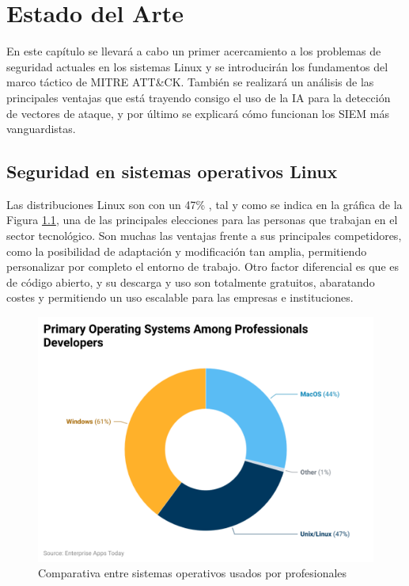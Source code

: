 \chapter{Estado del Arte}


\vspace{-0.3cm}

En este capítulo se llevará a cabo un primer acercamiento a los problemas de seguridad actuales en los sistemas Linux y se introducirán los fundamentos del marco táctico de MITRE \gls{ATT&CK}. También se realizará un análisis de las principales ventajas que está trayendo consigo el uso de la \gls{IA} para la detección de vectores de ataque, y por último se explicará cómo funcionan los \gls{SIEM} más vanguardistas.

\vspace{0.3cm}

\section{Seguridad en sistemas operativos Linux}

Las distribuciones Linux son con un 47\% \cite{linux-stats}, tal y como se indica en la gráfica de la Figura \ref{fig:linux-stats}, una de las principales elecciones para las personas que trabajan en el sector tecnológico. Son muchas las ventajas frente a sus principales competidores, como la posibilidad de adaptación y modificación tan amplia, permitiendo personalizar por completo el entorno de trabajo. Otro factor diferencial es que es de código abierto, y su descarga y uso son totalmente gratuitos, abaratando costes y permitiendo un uso escalable para las empresas e instituciones.

\begin{figure}[H]
    \vspace{-0.2cm}
    \centering
    \includegraphics[scale=0.245]{imagenes/primary-operating-systems-among-professionals-developers.png}
    \caption{Comparativa entre sistemas operativos usados por profesionales \cite{linux-stats}}
    \label{fig:linux-stats}
\end{figure}

